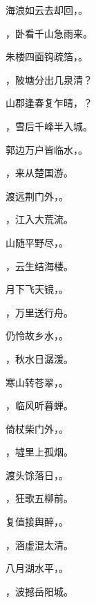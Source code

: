 \documentclass[12pt, a4paper, addpoints]{exam}
\begin{document}
\begin{questions}
\question[2] 海浪如云去却回，\uline{\qquad\qquad\qquad\qquad}。

\question[2] \uline{\qquad\qquad\qquad\qquad}，卧看千山急雨来。

\question[2] 朱楼四面钩疏箔，\uline{\qquad\qquad\qquad\qquad}。

\question[2] \uline{\qquad\qquad\qquad\qquad}，陂塘分出几泉清？

\question[2] 山郡逢春复乍晴，\uline{\qquad\qquad\qquad\qquad}？

\question[2] \uline{\qquad\qquad\qquad\qquad}，雪后千峰半入城。

\question[2] 郭边万户皆临水，\uline{\qquad\qquad\qquad\qquad}。

\question[2] \uline{\qquad\qquad\qquad\qquad}，来从楚国游。

\question[2] 渡远荆门外，\uline{\qquad\qquad\qquad\qquad}。

\question[2] \uline{\qquad\qquad\qquad\qquad}，江入大荒流。

\question[2] 山随平野尽，\uline{\qquad\qquad\qquad\qquad}。

\question[2] \uline{\qquad\qquad\qquad\qquad}，云生结海楼。

\question[2] 月下飞天镜，\uline{\qquad\qquad\qquad\qquad}。

\question[2] \uline{\qquad\qquad\qquad\qquad}，万里送行舟。

\question[2] 仍怜故乡水，\uline{\qquad\qquad\qquad\qquad}。

\question[2] \uline{\qquad\qquad\qquad\qquad}，秋水日潺湲。

\question[2] 寒山转苍翠，\uline{\qquad\qquad\qquad\qquad}。

\question[2] \uline{\qquad\qquad\qquad\qquad}，临风听暮蝉。

\question[2] 倚杖柴门外，\uline{\qquad\qquad\qquad\qquad}。

\question[2] \uline{\qquad\qquad\qquad\qquad}，墟里上孤烟。

\question[2] 渡头馀落日，\uline{\qquad\qquad\qquad\qquad}。

\question[2] \uline{\qquad\qquad\qquad\qquad}，狂歌五柳前。

\question[2] 复值接舆醉，\uline{\qquad\qquad\qquad\qquad}。

\question[2] \uline{\qquad\qquad\qquad\qquad}，涵虚混太清。

\question[2] 八月湖水平，\uline{\qquad\qquad\qquad\qquad}。

\question[2] \uline{\qquad\qquad\qquad\qquad}，波撼岳阳城。


\end{questions}
\end{document}
